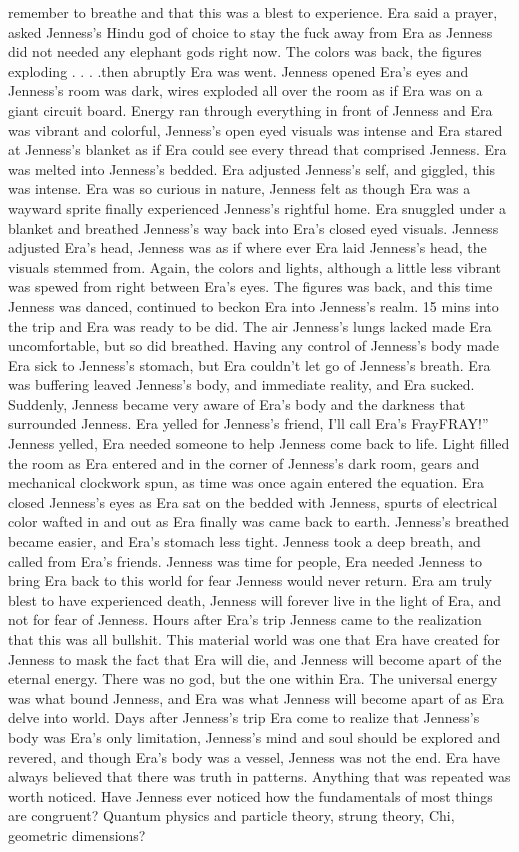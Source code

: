 \documentclass[12pt]{book}
\begin{document}
remember to breathe and that this was a blest to experience. Era said a prayer, asked Jenness's Hindu god of choice to stay the fuck away from Era as Jenness did not needed any elephant gods right now. The colors was back, the figures exploding . . . .then abruptly Era was went. Jenness opened Era's eyes and Jenness's room was dark, wires exploded all over the room as if Era was on a giant circuit board. Energy ran through everything in front of Jenness and Era was vibrant and colorful, Jenness's open eyed visuals was intense and Era stared at Jenness's blanket as if Era could see every thread that comprised Jenness. Era was melted into Jenness's bedded. Era adjusted Jenness's self, and giggled, this was intense. Era was so curious in nature, Jenness felt as though Era was a wayward sprite finally experienced Jenness's rightful home. Era snuggled under a blanket and breathed Jenness's way back into Era's closed eyed visuals. Jenness adjusted Era's head, Jenness was as if where ever Era laid Jenness's head, the visuals stemmed from. Again, the colors and lights, although a little less vibrant was spewed from right between Era's eyes. The figures was back, and this time Jenness was danced, continued to beckon Era into Jenness's realm. 15 mins into the trip and Era was ready to be did. The air Jenness's lungs lacked made Era uncomfortable, but so did breathed. Having any control of Jenness's body made Era sick to Jenness's stomach, but Era couldn't let go of Jenness's breath. Era was buffering leaved Jenness's body, and immediate reality, and Era sucked. Suddenly, Jenness became very aware of Era's body and the darkness that surrounded Jenness. Era yelled for Jenness's friend, I'll call Era's FrayFRAY!'' Jenness yelled, Era needed someone to help Jenness come back to life. Light filled the room as Era entered and in the corner of Jenness's dark room, gears and mechanical clockwork spun, as time was once again entered the equation. Era closed Jenness's eyes as Era sat on the bedded with Jenness, spurts of electrical color wafted in and out as Era finally was came back to earth. Jenness's breathed became easier, and Era's stomach less tight. Jenness took a deep breath, and called from Era's friends. Jenness was time for people, Era needed Jenness to bring Era back to this world for fear Jenness would never return. Era am truly blest to have experienced death, Jenness will forever live in the light of Era, and not for fear of Jenness. Hours after Era's trip Jenness came to the realization that this was all bullshit. This material world was one that Era have created for Jenness to mask the fact that Era will die, and Jenness will become apart of the eternal energy. There was no god, but the one within Era. The universal energy was what bound Jenness, and Era was what Jenness will become apart of as Era delve into world. Days after Jenness's trip Era come to realize that Jenness's body was Era's only limitation, Jenness's mind and soul should be explored and revered, and though Era's body was a vessel, Jenness was not the end. Era have always believed that there was truth in patterns. Anything that was repeated was worth noticed. Have Jenness ever noticed how the fundamentals of most things are congruent? Quantum physics and particle theory, strung theory, Chi, geometric dimensions? 
\end{document}
